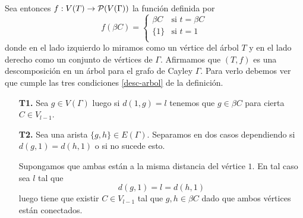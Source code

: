 \documentclass[tesis.tex]{subfiles}
\begin{document}
\begin{deff}
		
	  
	Sea entonces $f: V(T) \to {\cal{P}}(V(\Gamma))$ la función definida por 
	\[
		f(\beta C) =
		\begin{cases}
			\beta C & \text{si $t = \beta C$} \\
			\{1\}       & \text{si $t = 1$   } \\
		\end{cases}
	\]
	 donde en el lado izquierdo lo miramos como un vértice del árbol $T$ y en el lado derecho como un conjunto de vértices de $\Gamma$.
	Afirmamos que $(T,f)$ es una descomposición en un árbol para el grafo de Cayley $\Gamma$.
	Para verlo debemos ver que cumple las tres condiciones \ref{desc-arbol} de la definición. 
	\begin{enumerate}
		\item[\textbf{T1.}] Sea $g \in V(\Gamma)$ luego si $d(1,g) = l$
		tenemos que $g \in \beta C$ para cierta $C \in V_{l-1}$.		 
		
		
		\item[\textbf{T2.}] Sea una arista $\{g,h\} \in E(\Gamma)$. 
		Separamos en dos casos dependiendo si $d(g,1) = d(h,1)$ o si no sucede esto.
		
		Supongamos que ambas están a la misma distancia del vértice $1$. 
		En tal caso sea $l$ tal que 
		\[
			d(g,1)= l = d(h,1)
		\] 
		luego tiene que existir $C \in V_{l-1}$ 
		tal que $g,h \in \beta C$ dado que ambos vértices están conectados.
		

\end{enumerate}
\end{deff}
\end{document}
